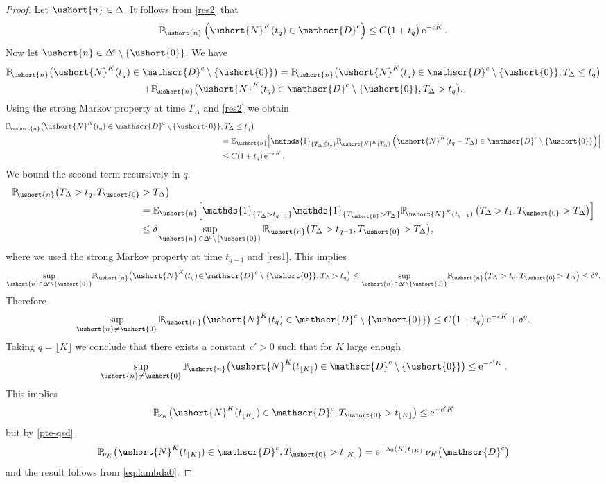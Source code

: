 \documentclass[10pt]{amsart}
\newcommand{\scaleto}[2]{#1}
\let\backslash\setminus
\let\mathcal\mathscr
\numberwithin{equation}{section}
\theoremstyle{plain}
\theoremstyle{definition}
\newcommand{\proba}{{\mathbb{P}}}
\newcommand{\E}{{\mathbb{E}}}
\newcommand{\un}{\mathds{1}}
\newcommand{\vecn}{\ushort{n}}
\newcommand{\veczer}{\ushort{0}}
\newcommand{\sDelta}{\Delta}
\newcommand{\ssDelta}{\Delta}
\newcommand{\leproc}{\ushort{N}^{K}}
\newcommand{\sleproc}{\ushort{N}^{K}}
\newcommand{\nuk}{\nu_{K}}\let\snuk\nuk
\newcommand{\e}{\operatorname{e}}
\begin{document}
\begin{proof}
Let $\vecn\in \Delta$. It follows from \eqref{res2} that
\[
\proba_{\!\vecn}\left(\leproc(t_q)\in \mathcal{D}^{c}\right)\le C\bigl(1+t_{q}\bigr)\e^{-cK}.
\]
Now let $\vecn\in \Delta^{\!c}\backslash\{\veczer\}$. We have
\begin{multline*}
\proba_{\!\vecn}\bigl(\leproc(t_q)\in \mathcal{D}^{c}\backslash \{\veczer\}\bigr)=
\proba_{\!\vecn}\bigl(\leproc(t_q)\in \mathcal{D}^{c}\backslash \{\veczer\},T_{\sDelta}\le t_{q}\bigr)\\
+
\proba_{\!\vecn}\bigl(\leproc(t_q)\in \mathcal{D}^{c}\backslash \{\veczer\},T_{\sDelta}>t_{q}\bigr).
\end{multline*}
Using the strong Markov property at time $T_{\sDelta}$ and \eqref{res2} we obtain
\begin{align*}
\proba_{\!\vecn}\bigl(\leproc(t_q)\in \mathcal{D}^{c}\backslash\{\veczer\}&,T_{\sDelta}\le t_{q}\bigr)\\
&= \E_{\vecn} \Bigl[\un_{\{T_{\ssDelta}\leq t_q\}} \proba_{\!\sleproc(T_{\ssDelta})}\left(\leproc(t_q-T_{\sDelta})\in \mathcal{D}^{c}\backslash \{\veczer\}\right)\Bigr]\\
& \leq C(1+t_q) \e^{-c K}.
\end{align*}
We bound the second term recursively in $q$.
\begin{align*}
\proba_{\!\vecn}\bigl(T_{\sDelta}>t_{q},T_{\veczer}&>T_{\sDelta}\bigr)\\
& = \E_{\vecn} \Bigl[\un_{\{T_{\ssDelta}>t_{q-1}\}} \un_{\{T_{\veczer}>T_{\ssDelta}\}}
\proba_{\!\sleproc(t_{q-1})}\left(T_{\sDelta}>t_1, T_{\veczer}>T_{\sDelta}\right)\Bigr]\\
& \leq \delta \sup_{\vecn\, \in \Delta^{\!c}\backslash \{\veczer\}}\proba_{\!\vecn}\bigl(T_{\sDelta}>t_{q-1},T_{\veczer}>T_{\sDelta}\bigr),
\end{align*}
where we used the strong Markov property at time $t_{q-1}$ and \eqref{res1}.
This implies
\[
\sup_{\vecn \in \Delta^{\!c}\backslash \{\veczer\}}\!\proba_{\!\vecn}\bigl(\leproc(t_q)\!\in\! \mathcal{D}^{c}
\backslash \{\veczer\},T_{\sDelta}\!>t_{q}\bigr)
\le
\sup_{\vecn \in \Delta^{\!c}\backslash \{\veczer\}} \!\proba_{\!\vecn}\bigl(T_{\sDelta}>t_{q},T_{\veczer}\!>T_{\sDelta}\bigr) \le \delta^{q}.
\]
Therefore
\[
\sup_{\vecn\neq\veczer}\proba_{\!\vecn}\bigl(\leproc(t_q)\in \mathcal{D}^{c}\backslash \{\veczer\}\bigr)\le
C\bigl(1+t_{q}\bigr)\e^{-c K}+\,\delta^{q}.
\]
Taking $q=\lfloor K \rfloor$ we conclude that there exists a constant $c'>0$ such that for $K$ large enough
\[
\sup_{\vecn\neq \veczer}\proba_{\!\vecn}\bigl(\leproc(t_{{ \lfloor K \rfloor}})\in \mathcal{D}^{c}
\backslash \{\veczer\}\bigr)\le\e^{-c' K}.
\]
This implies
\[
\proba_{\!\snuk}\bigl(\leproc(t_{{ \lfloor K \rfloor}})\in \mathcal{D}^{c},T_{\veczer}
>t_{{ \lfloor K \rfloor}}\bigr)\le \e^{-c' K}
\]
but by \eqref{pte-qsd}
\[
\proba_{\!\snuk}\bigl(\leproc(t_{{ \lfloor K \rfloor}})\in \mathcal{D}^{c},T_{\veczer}>t_{{ \lfloor K \rfloor}}\bigr)=
\e^{-\lambda_{0}(K)\hspace{.4pt} t_{\scaleto{\lfloor K \rfloor}{4pt}}}\nuk\bigl(\mathcal{D}^{c}\bigr)
\]
and the result follows from \eqref{eq:lambda0}.
\end{proof}
\end{document}
